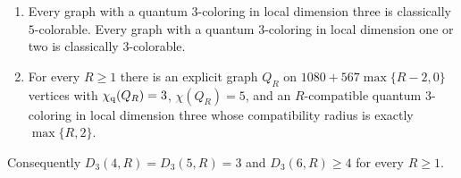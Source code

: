 \begin{theorem}\label{thm:qutrit}
\leavevmode
\begin{enumerate}
\item[(a)] Every graph with a quantum $3$-coloring in local dimension three is classically $5$-colorable. Every graph with a quantum $3$-coloring in local dimension one or two is classically $3$-colorable.
\item[(b)] For every $R\ge1$ there is an explicit graph $Q_R$ on $1080+567\max\{R-2,0\}$ vertices with $\chi_{\mathrm q}(Q_R)=3$, $\chi(Q_R)=5$, and an $R$-compatible quantum $3$-coloring in local dimension three whose compatibility radius is exactly $\max\{R,2\}$.
\end{enumerate}
Consequently $D_3(4,R)=D_3(5,R)=3$ and $D_3(6,R)\ge4$ for every $R\ge1$.
\end{theorem}
